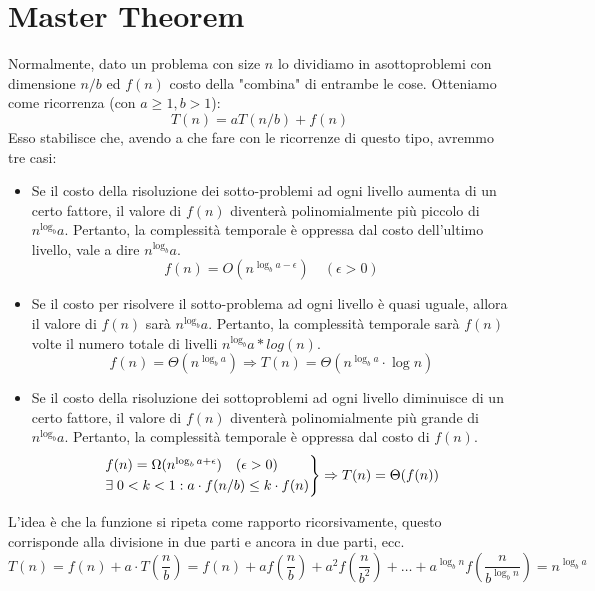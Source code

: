 \section{Master Theorem}
Normalmente, dato un problema con size $n$ lo dividiamo in asottoproblemi con dimensione $n/b$ ed $f(n)$ costo della "combina" di entrambe le cose.
Otteniamo come ricorrenza (con $a \geq 1, b > 1$):
\begin{equation*}
    T(n) = aT(n/b) + f(n)
\end{equation*}
Esso stabilisce che, avendo a che fare con le ricorrenze di questo tipo, avremmo tre casi:
\begin{itemize}
    \item Se il costo della risoluzione dei sotto-problemi ad ogni livello aumenta di un certo fattore, il valore di $f(n)$ diventerà polinomialmente più piccolo di $n^{\log_b}a$. Pertanto, la complessità temporale è oppressa dal costo dell'ultimo livello, vale a dire $n^{\log_b}a$.
    \begin{equation*}
        f(n) = O(n^{\log_b a-\epsilon}) \quad (\epsilon > 0)
    \end{equation*}
    \item Se il costo per risolvere il sotto-problema ad ogni livello è quasi uguale, allora il valore di $f(n)$ sarà $n^{\log_b}a$. Pertanto, la complessità temporale sarà $f(n)$ volte il numero totale di livelli $n^{\log_b}a * log(n)$.
    \begin{equation*}
        f(n) = \Theta(n^{\log_b a}) \Rightarrow T(n) = \Theta(n^{\log_b a} \cdot \log n)
    \end{equation*}
    \item Se il costo della risoluzione dei sottoproblemi ad ogni livello diminuisce di un certo fattore, il valore di $f(n)$ diventerà polinomialmente più grande di $n^{\log_b}a$. Pertanto, la complessità temporale è oppressa dal costo di $f(n)$.
    \begin{equation*}
        \begin{rcases}
            f(n) = \Omega(n^{\log_b a+\epsilon}) \quad (\epsilon > 0) \\
            \exists \; 0 < k < 1 : a \cdot f(n/b) \leq k \cdot f(n)
        \end{rcases}
        \Rightarrow T(n) = \Theta(f(n))
    \end{equation*} 
\end{itemize}

L'idea è che la funzione si ripeta come rapporto ricorsivamente, questo corrisponde alla divisione in due parti e ancora in due parti, ecc.
\begin{equation*}
    T(n) = f(n) + a \cdot T(\frac{n}{b}) = f(n) + af(\frac{n}{b}) + a^2 f(\frac{n}{b^2}) + \ldots + a^{\log_bn} f(\frac{n}{b^{\log_bn}}) = n^{\log_ba}
\end{equation*}

